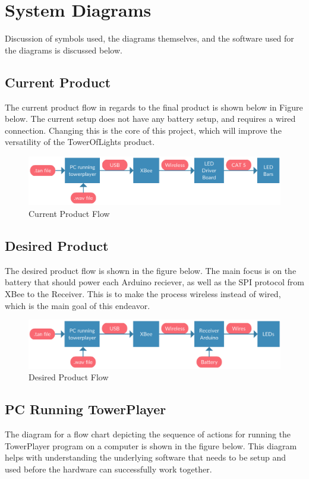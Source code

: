 \documentclass[12pt]{article}
\begin{document}
{\section{System Diagrams}
	Discussion of symbols used, the diagrams themselves, and the software used for the diagrams is discussed below.
	
	\subsection{Current Product}
	The current product flow in regards to the final product is shown below in Figure below. The current setup does not have any battery setup, and requires a wired connection. Changing this is the core of this project, which will improve the versatility of the TowerOfLights product.
	
		\begin{figure}[ht!]
			\centering
			\includegraphics[width=170mm]{assets/What_We_Have.png}
			\caption{Current Product Flow \label{overflow}}
		\end{figure}
	
	
	\subsection{Desired Product}
	The desired product flow is shown in the figure below. The main focus is on the battery that should power each Arduino reciever, as well as the SPI protocol from XBee to the Receiver. This is to make the process wireless instead of wired, which is the main goal of this endeavor.
	
	\begin{figure}[ht!]
		\centering
		\includegraphics[width=170mm]{assets/What_We_Want.png}
		\caption{Desired Product Flow \label{overflow}}
	\end{figure}


	\subsection{PC Running TowerPlayer}
	The diagram for a flow chart depicting the sequence of actions for running the TowerPlayer program on a computer is shown in the figure below. This diagram helps with understanding the underlying software that needs to be setup and used before the hardware can successfully work together.
	
}
\end{document}
